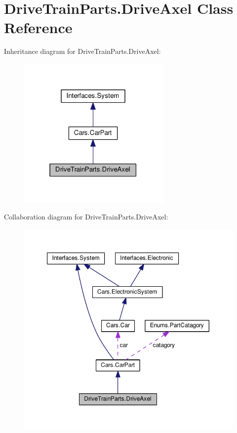 \hypertarget{classDriveTrainParts_1_1DriveAxel}{}\section{Drive\+Train\+Parts.\+Drive\+Axel Class Reference}
\label{classDriveTrainParts_1_1DriveAxel}


Inheritance diagram for Drive\+Train\+Parts.\+Drive\+Axel\+:\nopagebreak
\begin{figure}[H]
\begin{center}
\leavevmode
\includegraphics[width=211pt]{classDriveTrainParts_1_1DriveAxel__inherit__graph}
\end{center}
\end{figure}


Collaboration diagram for Drive\+Train\+Parts.\+Drive\+Axel\+:\nopagebreak
\begin{figure}[H]
\begin{center}
\leavevmode
\includegraphics[width=350pt]{classDriveTrainParts_1_1DriveAxel__coll__graph}
\end{center}
\end{figure}
